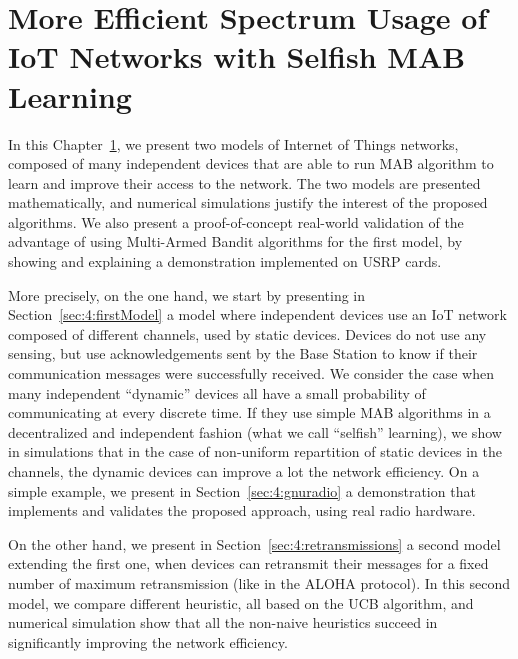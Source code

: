 
\chapter{More Efficient Spectrum Usage of IoT Networks with Selfish MAB Learning}
\label{chapter:4}
\minitoc

In this Chapter~\ref{chapter:4}, we present two models of Internet of Things networks, composed of many independent devices that are able to run MAB algorithm to learn and improve their access to the network.
The two models are presented mathematically, and numerical simulations justify the interest of the proposed algorithms.
We also present a proof-of-concept real-world validation of the advantage of using Multi-Armed Bandit algorithms for the first model, by showing and explaining a demonstration implemented on USRP \cite{USRPDocumentation} cards.

More precisely, on the one hand, we start by presenting in Section~\ref{sec:4:firstModel} a model where independent devices use an IoT network composed of different channels, used by static devices.
Devices do not use any sensing, but use acknowledgements sent by the Base Station to know if their communication messages were successfully received.
We consider the case when many independent ``dynamic'' devices all have a small probability of communicating at every discrete time. If they use simple MAB algorithms in a decentralized and independent fashion (what we call ``selfish'' learning),
we show in simulations that in the case of non-uniform repartition of static devices in the channels, the dynamic devices can improve a lot the network efficiency.
%
On a simple example, we present in Section~\ref{sec:4:gnuradio} a demonstration that implements and validates the proposed approach, using real radio hardware.

On the other hand, we present in Section~\ref{sec:4:retransmissions} a second model extending the first one, when devices can retransmit their messages for a fixed number of maximum retransmission (like in the ALOHA protocol).
In this second model, we compare different heuristic, all based on the UCB algorithm, and numerical simulation show that all the non-naive heuristics succeed in significantly improving the network efficiency.

\newpage
\graphicspath{{2-Chapters/4-Chapter/Images/}}


